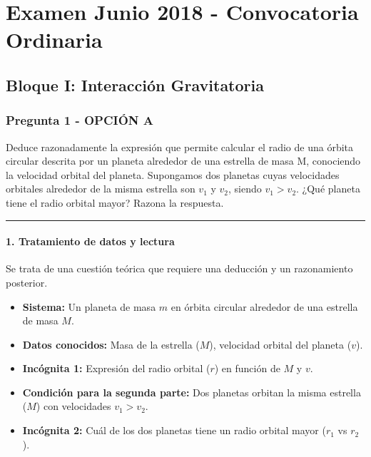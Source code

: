 \chapter{Examen Junio 2018 - Convocatoria Ordinaria}
\label{chap:2018_jun_ord}

\section{Bloque I: Interacción Gravitatoria}
\label{sec:grav_2018_jun_ord}

\subsection{Pregunta 1 - OPCIÓN A}
\label{subsec:1A_2018_jun_ord}

\begin{cajaenunciado}
Deduce razonadamente la expresión que permite calcular el radio de una órbita circular descrita por un planeta alrededor de una estrella de masa M, conociendo la velocidad orbital del planeta.
Supongamos dos planetas cuyas velocidades orbitales alrededor de la misma estrella son $v_{1}$ y $v_{2}$, siendo $v_{1}>v_{2}$. ¿Qué planeta tiene el radio orbital mayor? Razona la respuesta.
\end{cajaenunciado}
\hrule

\subsubsection*{1. Tratamiento de datos y lectura}
Se trata de una cuestión teórica que requiere una deducción y un razonamiento posterior.
\begin{itemize}
    \item \textbf{Sistema:} Un planeta de masa $m$ en órbita circular alrededor de una estrella de masa $M$.
    \item \textbf{Datos conocidos:} Masa de la estrella ($M$), velocidad orbital del planeta ($v$).
    \item \textbf{Incógnita 1:} Expresión del radio orbital ($r$) en función de $M$ y $v$.
    \item \textbf{Condición para la segunda parte:} Dos planetas orbitan la misma estrella ($M$) con velocidades $v_1 > v_2$.
    \item \textbf{Incógnita 2:} Cuál de los dos planetas tiene un radio orbital mayor ($r_1$ vs $r_2$).
\end{itemize}

